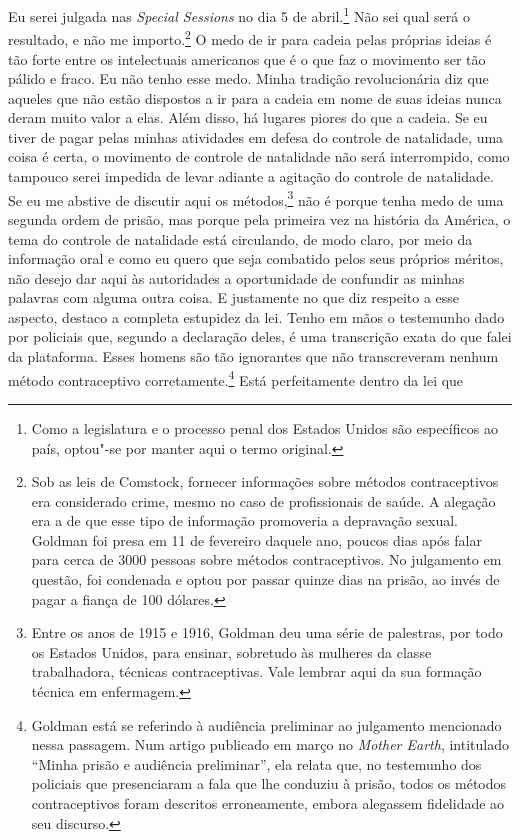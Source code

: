 Eu serei julgada nas \emph{Special Sessions} no dia 5 de
abril.\footnote{Como a legislatura e o processo penal dos Estados Unidos
  são específicos ao país, optou"-se por manter aqui o termo original.}
Não sei qual será o resultado, e não me importo.\footnote{Sob as leis de
  Comstock, fornecer informações sobre métodos contraceptivos era
  considerado crime, mesmo no caso de profissionais de saúde. A alegação
  era a de que esse tipo de informação promoveria a depravação sexual.
  Goldman foi presa em 11 de fevereiro daquele ano, poucos dias após
  falar para cerca de 3000 pessoas sobre métodos contraceptivos. No
  julgamento em questão, foi condenada e optou por passar quinze dias na
  prisão, ao invés de pagar a fiança de 100 dólares.} O medo de ir para
cadeia pelas próprias ideias é tão forte entre os intelectuais
americanos que é o que faz o movimento ser tão pálido e fraco. Eu não
tenho esse medo. Minha tradição revolucionária diz que aqueles que não
estão dispostos a ir para a cadeia em nome de suas ideias nunca deram
muito valor a elas. Além disso, há lugares piores do que a cadeia. Se eu
tiver de pagar pelas minhas atividades em defesa do controle de
natalidade, uma coisa é certa, o movimento de controle de natalidade não
será interrompido, como tampouco serei impedida de levar adiante a
agitação do controle de natalidade. Se eu me abstive de discutir aqui os
métodos,\footnote{Entre os anos de 1915 e 1916, Goldman deu uma série de
  palestras, por todo os Estados Unidos, para ensinar, sobretudo às
  mulheres da classe trabalhadora, técnicas contraceptivas. Vale lembrar
  aqui da sua formação técnica em enfermagem.} não é porque tenha medo
de uma segunda ordem de prisão, mas porque pela primeira vez na história
da América, o tema do controle de natalidade está circulando, de modo
claro, por meio da informação oral e como eu quero que seja combatido
pelos seus próprios méritos, não desejo dar aqui às autoridades a
oportunidade de confundir as minhas palavras com alguma outra coisa.
E justamente no que diz respeito a esse aspecto, destaco
a completa estupidez da lei. Tenho em
mãos o testemunho dado por policiais que, segundo a declaração deles, é
uma transcrição exata do que falei da plataforma. Esses homens são tão
ignorantes que não transcreveram nenhum método contraceptivo
corretamente.\footnote{Goldman está se referindo à audiência
  preliminar ao julgamento mencionado nessa passagem.
  Num artigo publicado em março no
  \emph{Mother Earth}, intitulado ``Minha prisão e audiência
  preliminar'', ela relata que, no testemunho dos policiais que
  presenciaram a fala que lhe conduziu à prisão, todos os métodos
  contraceptivos foram descritos erroneamente, embora alegassem
  fidelidade ao seu discurso.} Está perfeitamente dentro da lei que
